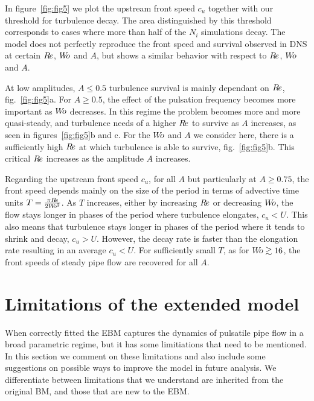 \documentclass{article}
\DeclareRobustCommand{\Reynolds}{\ensuremath{R\hspace{-0.1em}e}\xspace}     %
\DeclareRobustCommand{\Womersley}{\ensuremath{W\hspace{-0.25em}o}\xspace}    %
\DeclareRobustCommand{\Amplitude}{\ensuremath{A}\xspace}    %
\begin{document}
In figure~\ref{fig:fig5} we plot the upstream front speed $c_{u}$ together with our threshold for turbulence decay. The area distinguished by this threshold corresponds to cases where more than half of the $N_{i}$ simulations decay. The model does not perfectly reproduce the front speed and survival observed in DNS at certain \Reynolds, \Womersley and \Amplitude, but shows a similar behavior with respect to \Reynolds, \Womersley and \Amplitude.

At low amplitudes, $\Amplitude\leq0.5$ turbulence survival is mainly dependant on $\Reynolds$, fig.~\ref{fig:fig5}a. For $\Amplitude \geq 0.5$, the effect of the pulsation frequency becomes more important as $\Womersley$ decreases. In this regime the problem becomes more and more quasi-steady, and turbulence needs of a higher \Reynolds to survive as \Amplitude increases, as seen in figures~\ref{fig:fig5}b and c. For the \Womersley and \Amplitude we consider here, there is a sufficiently high \Reynolds at which turbulence is able to survive, fig.~\ref{fig:fig5}b. This critical \Reynolds increases as the amplitude \Amplitude increases.

Regarding the upstream front speed $c_{u}$, for all $\Amplitude$ but particularly at $\Amplitude \geq 0.75$, the front speed depends mainly on the size of the period in terms of advective time units $T=\frac{\pi \Reynolds}{2 \Womersley^{2}}$. As $T$ increases, either by increasing \Reynolds or decreasing \Womersley, the flow stays longer in phases of the period where turbulence elongates, $c_{u}<U$. This also means that turbulence stays longer in phases of the period where it tends to shrink and decay, $c_{u}>U$. However, the decay rate is faster than the elongation rate resulting in an average $c_{u}<U$. For sufficiently small $T$, as for $\Womersley \gtrsim 16$, the front speeds of steady pipe flow are recovered for all \Amplitude.




\section{Limitations of the extended model}
When correctly fitted the EBM captures the dynamics of pulsatile pipe flow in a broad parametric regime, but it has some limitiations that need to be mentioned. In this section we comment on these limitations and also include some suggestions on possible ways to improve the model in future analysis. We differentiate between limitations that we understand are inherited from the original BM, and those that are new to the EBM.
\end{document}
